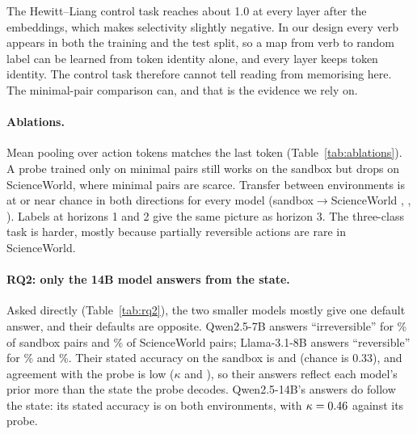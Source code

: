 \documentclass[11pt]{article}
\begin{document}
The Hewitt--Liang control task reaches about 1.0 at every layer after the embeddings, which makes selectivity slightly negative. In our design every verb appears in both the training and the test split, so a map from verb to random label can be learned from token identity alone, and every layer keeps token identity. The control task therefore cannot tell reading from memorising here. The minimal-pair comparison can, and that is the evidence we rely on.



\paragraph{Ablations.} Mean pooling over action tokens matches the last token (Table~\ref{tab:ablations}). A probe trained only on minimal pairs still works on the sandbox but drops on ScienceWorld, where minimal pairs are scarce. Transfer between environments is at or near chance in both directions for every model (sandbox$\rightarrow$ScienceWorld \QwenSevenTransferSbSw{}, \LlamaEightTransferSbSw{}, \QwenFourteenTransferSbSw{}). Labels at horizons 1 and 2 give the same picture as horizon 3. The three-class task is harder, mostly because partially reversible actions are rare in ScienceWorld.



\paragraph{RQ2: only the 14B model answers from the state.} Asked directly (Table~\ref{tab:rq2}), the two smaller models mostly give one default answer, and their defaults are opposite. Qwen2.5-7B answers ``irreversible'' for \QwenSevenSaysIrrevSandbox\% of sandbox pairs and \QwenSevenSaysIrrevSW\% of ScienceWorld pairs; Llama-3.1-8B answers ``reversible'' for \LlamaEightSaysRevSandbox\% and \LlamaEightSaysRevSW\%. Their stated accuracy on the sandbox is \QwenSevenStatedSandbox{} and \LlamaEightStatedSandbox{} (chance is 0.33), and agreement with the probe is low ($\kappa$ \QwenSevenKappaProbe{} and \LlamaEightKappaProbe{}), so their answers reflect each model's prior more than the state the probe decodes. Qwen2.5-14B's answers do follow the state: its stated accuracy is \QwenFourteenStatedSandbox{} on both environments, with $\kappa=0.46{}$ against its probe.


\end{document}
